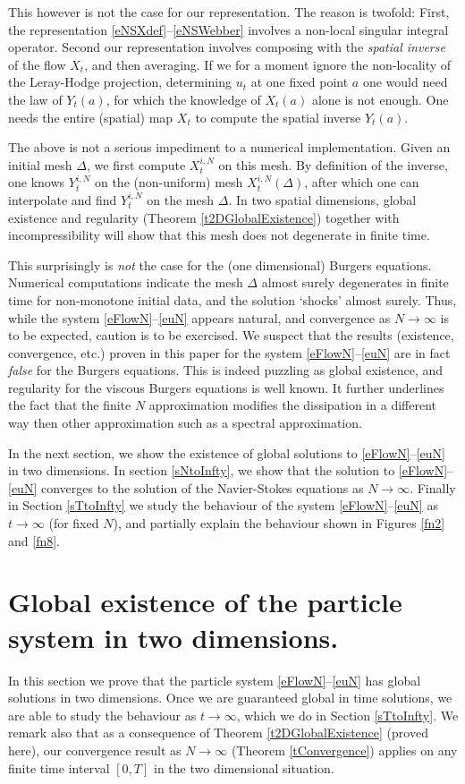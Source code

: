 \documentclass[final]{amsart}%
\newcommand{\slns}{\eqref{eNSXdef}--\eqref{eNSWebber}\xspace}
\newcommand{\mceuler}{\eqref{eFlowN}--\eqref{euN}\xspace}
\numberwithin{equation}{section}
\theoremstyle{definition}
\theoremstyle{remark}
\begin{document}
This however is not the case for our representation. The reason is twofold: First, the representation \slns involves a non-local singular integral operator. Second our representation involves composing with the \textit{spatial inverse} of the flow $X_t$, and then averaging. If we for a moment ignore the non-locality of the Leray-Hodge projection, determining $u_t$ at one fixed point $a$ one would need the law of $Y_t(a)$, for which the knowledge of $X_t(a)$ alone is not enough. One needs the entire (spatial) map $X_t$ to compute the spatial inverse $Y_t(a)$.

The above is not a serious impediment to a numerical implementation. Given an initial mesh $\Delta$, we first compute $X^{i,N}_t$ on this mesh. By definition of the inverse, one knows $Y^{i,N}_t$ on the (non-uniform) mesh $X^{i,N}_t(\Delta)$, after which one can interpolate and find $Y^{i,N}_t$ on the mesh $\Delta$. In two spatial dimensions, global existence and regularity (Theorem \ref{t2DGlobalExistence}) together with incompressibility will show that this mesh does not degenerate in finite time.

This surprisingly is \textit{not} the case for the (one dimensional)
Burgers equations. Numerical computations indicate the mesh $\Delta$
almost surely degenerates in finite time for non-monotone initial
data, and the solution `shocks' almost surely. Thus, while the system
\mceuler appears natural, and convergence as $N \to \infty$ is to be
expected, caution is to be exercised. We suspect that the results
(existence, convergence, etc.) proven in this paper for the system
\mceuler are in fact \textit{false} for the Burgers equations. This is
indeed puzzling as global existence, and regularity for the viscous
Burgers equations is well known. It further underlines the fact that
the finite $N$ approximation modifies the dissipation in a different
way then other approximation such as a spectral
approximation. \medskip

In the next section, we show the existence of global solutions to
\mceuler in two dimensions. In section \ref{sNtoInfty}, we show that
the solution to \mceuler converges to the solution of the
Navier-Stokes equations as $N \to \infty$. Finally in Section
\ref{sTtoInfty} we study the behaviour of the system \mceuler as $t
\to \infty$ (for fixed $N$), and partially explain the behaviour shown
in Figures \ref{fn2} and \ref{fn8}.

\section{Global existence of the particle system in two dimensions.}\label{sGexist}%
In this section we prove that the particle system \mceuler has global
solutions in two dimensions. Once we are guaranteed global in time
solutions, we are able to study the behaviour as $t \to \infty$, which
we do in Section \ref{sTtoInfty}. We remark also that as a consequence
of Theorem \ref{t2DGlobalExistence} (proved here), our convergence
result as $N \to \infty$ (Theorem \ref{tConvergence}) applies on any
finite time interval $[0,T]$ in the two dimensional situation.\medskip
\end{document}
